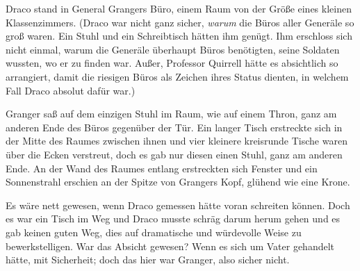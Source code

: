 Draco stand in General Grangers Büro, einem Raum von der Größe eines kleinen Klassenzimmers. (Draco war nicht ganz sicher, \emph{warum} die Büros aller Generäle so groß waren. Ein Stuhl und ein Schreibtisch hätten ihm genügt. Ihm erschloss sich nicht einmal, warum die Generäle überhaupt Büros benötigten, seine Soldaten wussten, wo er zu finden war. Außer, Professor Quirrell hätte es absichtlich so arrangiert, damit die riesigen Büros als Zeichen ihres Status dienten, in welchem Fall Draco absolut dafür war.)

Granger saß auf dem einzigen Stuhl im Raum, wie auf einem Thron, ganz am anderen Ende des Büros gegenüber der Tür. Ein langer Tisch erstreckte sich in der Mitte des Raumes zwischen ihnen und vier kleinere kreisrunde Tische waren über die Ecken verstreut, doch es gab nur diesen einen Stuhl, ganz am anderen Ende. An der Wand des Raumes entlang erstreckten sich Fenster und ein Sonnenstrahl erschien an der Spitze von Grangers Kopf, glühend wie eine Krone.

Es wäre nett gewesen, wenn Draco gemessen hätte voran schreiten können. Doch es war ein Tisch im Weg und Draco musste schräg darum herum gehen und es gab keinen guten Weg, dies auf dramatische und würdevolle Weise zu bewerkstelligen. War das Absicht gewesen? Wenn es sich um Vater gehandelt hätte, mit Sicherheit; doch das hier war Granger, also sicher nicht.

